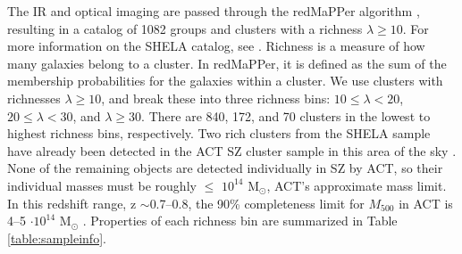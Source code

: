 \documentclass[a4paper,fleqn,usenatbib]{mnras}
\begin{document}
The IR and optical imaging are passed through the redMaPPer algorithm \citep{2014ApJ...785..104R}, resulting in a catalog of 1082 groups and clusters with a richness $\lambda \geq 10.$ 
For more information on the SHELA catalog, see \cite{2019ApJS..240....5W}.
Richness is a measure of how many galaxies belong to a cluster. 
In redMaPPer, it is defined as the sum of the membership probabilities for the galaxies within a cluster. 
We use clusters with richnesses $\lambda \geq 10$, and break these into three richness bins: $10 \leq \lambda < 20$, $20 \leq \lambda < 30$, and $\lambda \geq 30$. 
{There are 840, 172, and 70 clusters in the lowest to highest richness bins, respectively.} 
Two rich clusters from the SHELA sample have already been detected in the ACT SZ cluster sample in this area of the sky \citep{2013JCAP...07..008H}.  
None of the remaining objects are detected individually in SZ by ACT, so their individual masses must be roughly $\leq$ $10^{14}$ M$_\odot$, ACT's approximate mass limit.
In this redshift range, z $\sim$0.7--0.8, the 90\% completeness limit for $M_{500}$ in ACT is 4--5 $\cdot 10^{14}$ M$_{\odot}$ \citep{2018ApJS..235...20H}.   
Properties of each richness bin are summarized in Table \ref{table:sampleinfo}.
\end{document}
